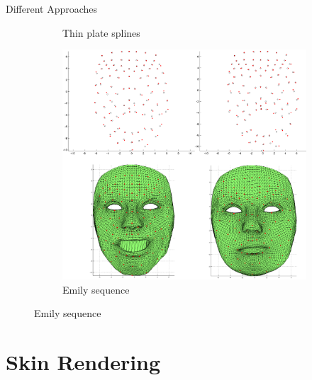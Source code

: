 \documentclass{beamer}
\begin{document}
\begin{frame}{Different Approaches}
{\begin{figure}
\begin{subfigure}[b]{0.2\textwidth}
                \caption{\hspace{0.2cm} Thin plate splines}
        \end{subfigure}
        \begin{subfigure}[b]{0.3\textwidth}
                \includegraphics[width=\textwidth]{img/Emilydomain}
                \caption{Emily sequence}
        \end{subfigure}
\end{figure}}


\end{frame}
\section{Skin Rendering}

\end{document}
